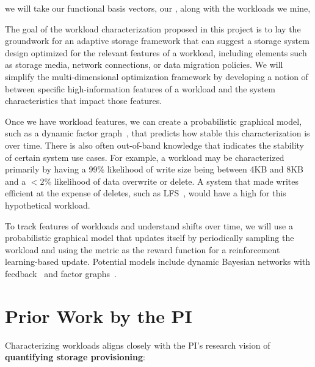 we will take our functional basis vectors,
our \mWs, along with the workloads we mine, %


The goal of the workload characterization proposed in this project is to lay
the groundwork for an adaptive storage framework that can suggest a 
storage system design optimized for the relevant features of a workload, including elements such as storage media, network
connections, or data migration policies.  We will simplify the multi-dimensional
optimization framework by developing a notion of \systemfit between specific
high-information features of a workload and the system characteristics that
impact those features.  %

Once we have workload features, we can create a probabilistic graphical model,
such as a dynamic factor graph~\cite{lecunfactor}, that predicts how stable this
characterization is over time.  There is also often out-of-band knowledge that
indicates the stability of certain system use cases.
For example, a
workload may be characterized primarily by having a 99\% likelihood of write
size being between 4KB and 8KB and a $< 2$\% likelihood of data overwrite or
delete.  A system that made writes efficient at the expense of deletes, such as
LFS~\cite{lfs}, would have a high \systemfit for this hypothetical workload.

To track features of workloads and understand shifts over time, we will use a
probabilistic graphical model that updates itself by periodically sampling the
workload and using the \systemfit metric as the reward function for a
reinforcement learning-based update.  Potential models include dynamic Bayesian
networks with feedback~\cite{poupart2006analytic} and factor
graphs~\cite{lecunfactor}.  

\section{Prior Work by the PI}
Characterizing workloads aligns closely with the PI's research vision of \textbf{quantifying storage provisioning}:

